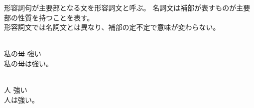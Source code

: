形容詞句が主要部となる文を形容詞文と呼ぶ。
名詞文は補部が表すものが主要部の性質を持つことを表す。\\
形容詞文では名詞文とは異なり、補部の定不定で意味が変わらない。

\begin{exe}
    \ex {} \\
        私の母 強い \\
    \glt 私の母は強い。
\end{exe}
\begin{exe}
    \ex \gll [ap\'a] [nup\'i] \\
        人 強い \\
    \glt 人は強い。
\end{exe}